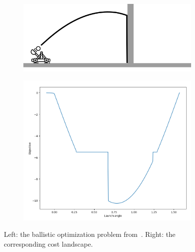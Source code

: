 \begin{figure}[t]
    \centering
    \begin{subfigure}[t]{0.6\linewidth}
        \centering
        \includegraphics[width=\linewidth]{images/global_methods/ballistic.png}
    \end{subfigure}
    \begin{subfigure}[t]{0.3\linewidth}
        \centering
        \includegraphics[width=\linewidth]{images/global_methods/ballistic_cost.png}
    \end{subfigure}%
    \caption{Left: the ballistic optimization problem from~\cite{suhDifferentiableSimulatorsGive2022}. Right: the corresponding cost landscape.}
    \label{ch:corl:fig:ballistic}
\end{figure}

